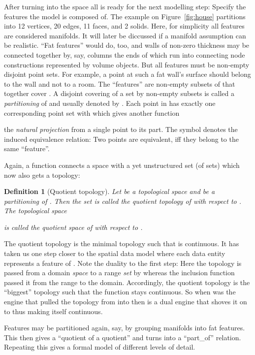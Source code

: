 \documentclass[5p]{elsarticle}
\newtheorem{dfn}{Definition}
\newcommand{\qq}[1]{``#1''}
\begin{document}
After turning  into the space  all is ready for the next modelling step: 
Specify the features the model is composed of. 
The example on Figure~\ref{fig:house} partitions  into 12 vertices, 20 edges, 
11 faces, and 2 solids. 
Here, for simplicity all features are considered manifolds. 
It will later be diccussed if a manifold assumption can be realistic. 
\qq{Fat features} would do, too, and walls of non-zero 
thickness may be connected together by, say, columns the ends of which run into 
connecting node constructions represented by volume objects. 
But all features must be non-empty disjoint point sets. 
For example, a point at such a fat wall's surface should belong to the wall and not to a room. 
The \qq{features} are non-empty subsets of  that together cover . 
A disjoint covering of a set  by non-empty subsets is called a \emph{partitioning} of  
and usually denoted by . Each point  in  has exactly one corresponding 
point set  with  which gives another function 

the \emph{natural projection} from a single point to its part. 
The symbol  denotes the induced equivalence relation: Two points are equivalent, iff 
they belong to the same \qq{feature}. 

Again, a function connects a space  with a yet unstructured 
set (of sets)  which now also gets a topology: 

\begin{dfn}[Quotient topology]
Let  be a topological space and  be a partitioning of . 
Then the set  
is called the \emph{quotient topology} of  with respect to . 
The topological space 
 
is called the \emph{quotient space} of  with respect to .
\end{dfn}

The quotient topology is the minimal topology such that  is continuous. 
It has taken us one step closer to the spatial data model where each data entity 
represents a feature of . 
Note the duality to the first step: Here the topology is passed from a domain \emph{space} 
to a range \emph{set} by  whereas the inclusion function passed it from the range to the 
domain. 
Accordingly, the quotient topology is the \qq{biggest} topology such that the function 
 stays continuous. 
So when  was the engine that pulled the topology from  into  then  
is a dual engine that shoves it on to  thus making itself continuous. 

Features may be partitioned again, say, by grouping manifolds into fat features. 
This then gives a \qq{quotient of a quotient} and turns  into a \qq{part\_of} relation. 
Repeating this gives a formal model of different levels of detail. 
\end{document}

